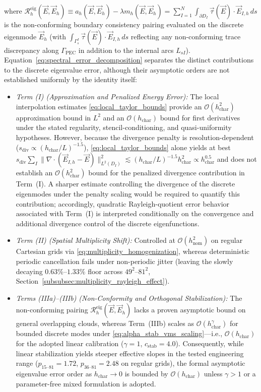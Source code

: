 \documentclass[VANCOUVER]{USG}
\begin{document}
where $\mathcal{R}_h^{\mathrm{eig}}(\vec{E}, \vec{E}_h) \equiv a_h(\vec{E}, \vec{E}_h) - \lambda m_h(\vec{E}, \vec{E}_h) = \sum_{I=1}^N \int_{\partial D_I} \vec{\tau}(\vec{E}) \cdot \vec{E}_{I,h} \, ds$ is the non-conforming boundary consistency pairing evaluated on the discrete eigenmode $\vec{E}_h$ (with $\int_{\Gamma_s^I} \vec{\tau}(\vec{E})\cdot\vec{E}_{I,h}\,ds$ reflecting any non-conforming trace discrepancy along $\Gamma_{\mathrm{PEC}}$ in addition to the internal arcs $L_{sI}$). Equation~\eqref{eq:spectral_error_decomposition} separates the distinct contributions to the discrete eigenvalue error, although their asymptotic orders are not established uniformly by the identity itself:
\begin{itemize}
    \item \emph{Term (I) (Approximation and Penalized Energy Error):} The local interpolation estimates \eqref{eq:local_taylor_bounds} provide an $\mathcal{O}(h_{\mathrm{char}}^2)$ approximation bound in $L^2$ and an $\mathcal{O}(h_{\mathrm{char}})$ bound for first derivatives under the stated regularity, stencil-conditioning, and quasi-uniformity hypotheses. However, because the divergence penalty is resolution-dependent ($s_{\mathrm{div}} \propto (h_{\mathrm{char}}/L)^{-1.5}$), \eqref{eq:local_taylor_bounds} alone yields at best $s_{\mathrm{div}} \sum_I \|\nabla \cdot (\vec{E}_{I,h} - \vec{E})\|_{L^2(D_I)}^2 \lesssim (h_{\mathrm{char}}/L)^{-1.5} h_{\mathrm{char}}^2 \propto h_{\mathrm{char}}^{0.5}$ and does not establish an $\mathcal{O}(h_{\mathrm{char}}^2)$ bound for the penalized divergence contribution in Term~(I). A sharper estimate controlling the divergence of the discrete eigenmodes under the penalty scaling would be required to quantify this contribution; accordingly, quadratic Rayleigh-quotient error behavior associated with Term~(I) is interpreted conditionally on the convergence and additional divergence control of the discrete eigenfunctions.
    \item \emph{Term (II) (Spatial Multiplicity Shift):} Controlled at $\mathcal{O}(h_{\mathrm{nom}}^2)$ on regular Cartesian grids via \eqref{eq:multiplicity_homogenization}, whereas deterministic periodic cancellation fails under non-periodic jitter (leaving the slowly decaying $0.63\%\text{--}1.33\%$ floor across $49^2\text{--}81^2$, Section~\ref{subsubsec:multiplicity_rayleigh_effect}).
    \item \emph{Terms (IIIa)--(IIIb) (Non-Conformity and Orthogonal Stabilization):} The non-conforming pairing $\mathcal{R}_h^{\mathrm{eig}}(\vec{E}, \vec{E}_h)$ lacks a proven asymptotic bound on general overlapping clouds, whereas Term~(IIIb) scales as $\mathcal{O}(h_{\mathrm{char}}^{\gamma})$ for bounded discrete modes under \eqref{eq:alpha_stab_vms_scaling}---i.e., $\mathcal{O}(h_{\mathrm{char}})$ for the adopted linear calibration ($\gamma = 1$, $c_{\mathrm{stab}} = 4.0$). Consequently, while linear stabilization yields steeper effective slopes in the tested engineering range ($p_{15\text{--}81} = 1.72$, $p_{36\text{--}81} = 2.48$ on regular grids), the formal asymptotic eigenvalue error order as $h_{\mathrm{char}} \to 0$ is bounded by $\mathcal{O}(h_{\mathrm{char}})$ unless $\gamma > 1$ or a parameter-free mixed formulation is adopted.
\end{itemize}
\end{document}
